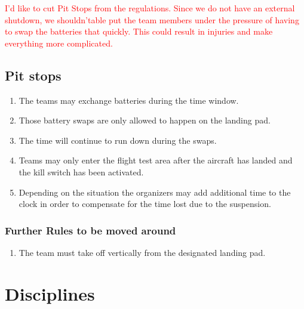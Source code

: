     \textcolor{red}{I'd like to cut Pit Stops from the regulations. Since we do not have an external shutdown, we shouldn'table
    put the team members under the pressure of having to swap the batteries that quickly. This could result in injuries and make everything more complicated.} 
    \subsection{Pit stops}
    \begin{enumerate}
      \item The teams may exchange batteries during the time window. 
      \item Those battery swaps are only allowed to happen on the landing pad. 
      \item The time will continue to run down during the swaps. 
      \item Teams may only enter the flight test area after the aircraft has landed and the kill switch has been activated.  
      \item Depending on the situation the organizers may add additional time to the clock in order to compensate for the time lost due to the suspension. 
    \end{enumerate}

    
  
    \subsubsection{Further Rules to be moved around}
    \begin{enumerate}
      \item The team must take off vertically from the designated landing pad.  
    \end{enumerate}


    \section{Disciplines}
